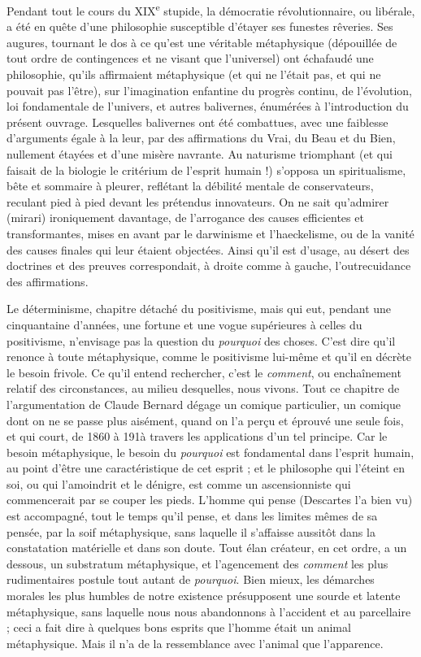 \documentclass[french,twoside]{book} %
\begin{document}
Pendant tout le cours du XIX\textsuperscript{e} stupide, la démocratie révolutionnaire, ou libérale, a été en quête d’une philosophie susceptible d’étayer ses funestes rêveries. Ses augures, tournant le dos à ce qu’est une véritable métaphysique (dépouillée de tout ordre de contingences et ne visant que l’universel) ont échafaudé une philosophie, qu’ils affirmaient métaphysique (et qui ne l’était pas, et qui ne pouvait pas l’être), sur l’imagination enfantine du progrès continu, de l’évolution, loi fondamentale de l’univers, et autres balivernes, énumérées à l’introduction du présent ouvrage. Lesquelles balivernes ont été combattues, avec une faiblesse d’arguments égale à la leur, par des affirmations du Vrai, du Beau et du Bien, nullement étayées et d’une misère navrante. Au naturisme triomphant (et qui faisait de la biologie le critérium de l’esprit humain !) s’opposa un spiritualisme, bête et sommaire à pleurer, reflétant la débilité mentale de conservateurs, reculant pied à pied devant les prétendus innovateurs. On ne sait qu’admirer (mirari) ironiquement davantage, de l’arrogance des causes efficientes et transformantes, mises en avant par le darwinisme et l’haeckelisme, ou de la vanité des causes finales qui leur étaient objectées. Ainsi qu’il est d’usage, au désert des doctrines et des preuves correspondait, à droite comme à gauche, l’outrecuidance des affirmations.\par
Le déterminisme, chapitre détaché du positivisme, mais qui eut, pendant une cinquantaine d’années, une fortune et une vogue supérieures à celles du positivisme, n’envisage pas la question du {\itshape pourquoi} des choses. C’est dire qu’il renonce à toute métaphysique, comme le positivisme lui-même et qu’il en décrète le besoin frivole. Ce qu’il entend rechercher, c’est le {\itshape comment}, ou enchaînement relatif des circonstances, au milieu desquelles, nous vivons. Tout ce chapitre de l’argumentation de Claude Bernard dégage un comique particulier, un comique dont on ne se passe plus aisément, quand on l’a perçu et éprouvé une seule fois, et qui court, de 1860 à 191à travers les applications d’un tel principe. Car le besoin métaphysique, le besoin du {\itshape pourquoi} est fondamental dans l’esprit humain, au point d’être une caractéristique de cet esprit ; et le philosophe qui l’éteint en soi, ou qui l’amoindrit et le dénigre, est comme un ascensionniste qui commencerait par se couper les pieds. L’homme qui pense (Descartes l’a bien vu) est accompagné, tout le temps qu’il pense, et dans les limites mêmes de sa pensée, par la soif métaphysique, sans laquelle il s’affaisse aussitôt dans la constatation matérielle et dans son doute. Tout élan créateur, en cet ordre, a un dessous, un substratum métaphysique, et l’agencement des {\itshape comment} les plus rudimentaires postule tout autant de {\itshape pourquoi}. Bien mieux, les démarches morales les plus humbles de notre existence présupposent une sourde et latente métaphysique, sans laquelle nous nous abandonnons à l’accident et au parcellaire ; ceci a fait dire à quelques bons esprits que l’homme était un animal métaphysique. Mais il n’a de la ressemblance avec l’animal que l’apparence.\par
\end{document}
